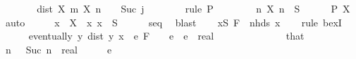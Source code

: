\begin{isabellebody}
\ \ \ \ \isamarkupfalse%
\ \isamarkupfalse%
\ {\isachardoublequoteopen}dist\ {\isacharparenleft}{\kern0pt}X\ m{\isacharparenright}{\kern0pt}\ {\isacharparenleft}{\kern0pt}X\ n{\isacharparenright}{\kern0pt}\ {\isacharless}{\kern0pt}\ {}\ {\isacharslash}{\kern0pt}\ Suc\ j{\isachardoublequoteclose}\isanewline
\ \ \ \ \ \ \isamarkupfalse%
\ {\isacharparenleft}{\kern0pt}rule\ P{\isacharparenright}{\kern0pt}\isanewline
\ \ \isamarkupfalse%
\isanewline
\ \ \isamarkupfalse%
\ \isamarkupfalse%
\ {\isachardoublequoteopen}{\isasymforall}n{\isachardot}{\kern0pt}\ X\ n\ {\isasymin}\ S{\isachardoublequoteclose}\isanewline
\ \ \ \ \isamarkupfalse%
\ P{\isacharparenleft}{\kern0pt}{}{\isacharparenright}{\kern0pt}\ X\ \isamarkupfalse%
\ auto\isanewline
\ \ \isamarkupfalse%
\ \isamarkupfalse%
\ x\ \ {\isachardoublequoteopen}X\ {\isasymlonglonglongrightarrow}\ x{\isachardoublequoteclose}\ {\isachardoublequoteopen}x\ {\isasymin}\ S{\isachardoublequoteclose}\isanewline
\ \ \ \ \isamarkupfalse%
\ seq\ \isamarkupfalse%
\ blast\isanewline
\isanewline
\ \ \isamarkupfalse%
\ {\isachardoublequoteopen}{\isasymexists}x{\isasymin}S{\isachardot}{\kern0pt}\ F\ {\isasymle}\ nhds\ x{\isachardoublequoteclose}\isanewline
\ \ \isamarkupfalse%
\ {\isacharparenleft}{\kern0pt}rule\ bexI{\isacharparenright}{\kern0pt}\isanewline
\ \ \ \ \isamarkupfalse%
\ {\isachardoublequoteopen}eventually\ {\isacharparenleft}{\kern0pt}{\isasymlambda}y{\isachardot}{\kern0pt}\ dist\ y\ x\ {\isacharless}{\kern0pt}\ e{\isacharparenright}{\kern0pt}\ F{\isachardoublequoteclose}\ \ {\isachardoublequoteopen}{}\ {\isacharless}{\kern0pt}\ e{\isachardoublequoteclose}\ \ e\ {\isacharcolon}{\kern0pt}{\isacharcolon}{\kern0pt}\ real\isanewline
\ \ \ \ \isamarkupfalse%
\ {\isacharminus}{\kern0pt}\isanewline
\ \ \ \ \ \ \isamarkupfalse%
\ that\ \isamarkupfalse%
\ {\isachardoublequoteopen}{\isacharparenleft}{\kern0pt}{\isasymlambda}n{\isachardot}{\kern0pt}\ {}\ {\isacharslash}{\kern0pt}\ Suc\ n\ {\isacharcolon}{\kern0pt}{\isacharcolon}{\kern0pt}\ real{\isacharparenright}{\kern0pt}\ {\isasymlonglonglongrightarrow}\ {}\ {\isasymand}\ {}\ {\isacharless}{\kern0pt}\ e\ {\isacharslash}{\kern0pt}\ {}{\isachardoublequoteclose}\isanewline

\end{isabellebody}
